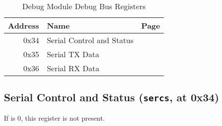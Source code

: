 
\begin{table}[H]
   \begin{center}
      \caption{Debug Module Debug Bus Registers}
      \label{None}
      \begin{tabular}{|r|l|l|}
      \hline
      Address & Name & Page \\
      \hline
0x34 & Serial Control and Status & \pageref{sercs} \\
0x35 & Serial TX Data & \pageref{sertx} \\
0x36 & Serial RX Data & \pageref{serrx} \\
         \hline
      \end{tabular}
   \end{center}
\end{table}
\subsection{Serial Control and Status ({\tt sercs}, at 0x34)}
\label{sercs}
If \Fserialcount is 0, this register is not present.

